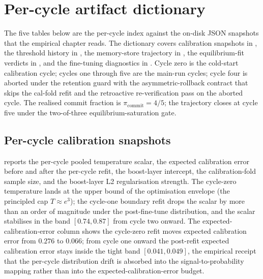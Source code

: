 
\chapter{Per-cycle artifact dictionary}
\label{app:per-cycle}

The five tables below are the per-cycle index against the on-disk JSON snapshots that the empirical chapter reads. The dictionary covers calibration snapshots in , the threshold history in , the memory-store trajectory in , the equilibrium-fit verdicts in , and the fine-tuning diagnostics in . Cycle zero is the cold-start calibration cycle; cycles one through five are the main-run cycles; cycle four is aborted under the retention guard with the asymmetric-rollback contract that skips the cal-fold refit and the retroactive re-verification pass on the aborted cycle. The realised commit fraction is $\pi_{\mathrm{commit}} = 4/5$; the trajectory closes at cycle five under the two-of-three equilibrium-saturation gate.

\section{Per-cycle calibration snapshots}
\label{app:per-cycle-cal}

 reports the per-cycle pooled temperature scalar, the expected calibration error before and after the per-cycle refit, the boost-layer intercept, the calibration-fold sample size, and the boost-layer L2 regularisation strength. The cycle-zero temperature lands at the upper bound of the optimisation envelope (the principled cap $T \approx e^{3}$); the cycle-one boundary refit drops the scalar by more than an order of magnitude under the post-fine-tune distribution, and the scalar stabilises in the band $[0.74, 0.87]$ from cycle two onward. The expected-calibration-error column shows the cycle-zero refit moves expected calibration error from $0.276$ to $0.066$; from cycle one onward the post-refit expected calibration error stays inside the tight band $[0.041, 0.049]$, the empirical receipt that the per-cycle distribution drift is absorbed into the signal-to-probability mapping rather than into the expected-calibration-error budget.

